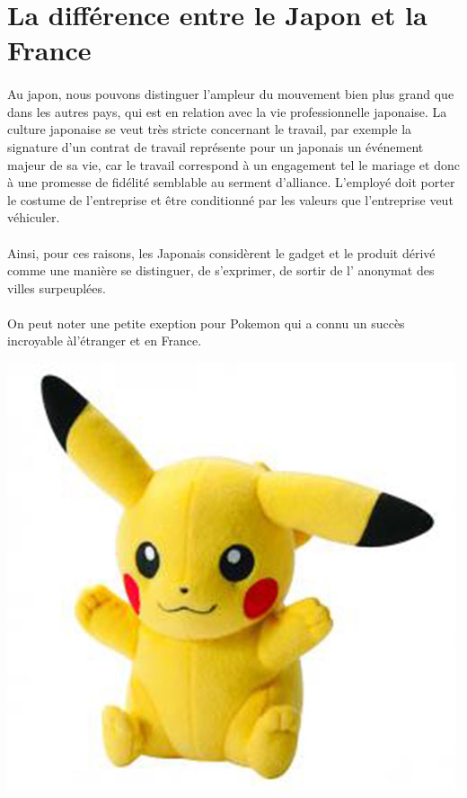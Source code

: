 \section{La différence entre le Japon et la France}

\paragraph{} Au japon, nous pouvons distinguer l’ampleur du mouvement bien plus
grand que dans les autres pays, qui est en relation avec la vie professionnelle
japonaise. La culture japonaise se veut très stricte concernant le travail, par
exemple la signature d’un contrat de travail représente pour un japonais un
événement majeur de sa vie, car le travail correspond à un engagement tel le
mariage et donc à une promesse de fidélité semblable au serment d’alliance.
L’employé doit porter le costume de l’entreprise et être conditionné par les
valeurs que l’entreprise veut véhiculer. 

\paragraph{} Ainsi, pour ces raisons, les Japonais considèrent le gadget et le
produit dérivé comme une manière se distinguer, de s’exprimer, de sortir de l’
anonymat des villes surpeuplées. 

\paragraph{} On peut noter une petite exeption pour Pokemon qui a connu un
succès incroyable àl’étranger et en France.

\begin{center}
	\includegraphics[scale=0.15]{pokemon.jpg}
\end{center}

